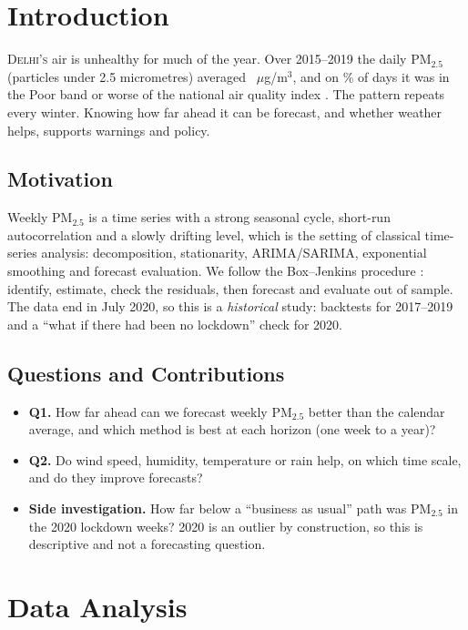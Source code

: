 \documentclass[11pt,a4paper,twoside,twocolumn]{extarticle}
\newcommand{\pmtwo}{PM$_{2.5}$}
\newcommand{\ugm}{$\mu$g/m$^3$}
\newcommand{\sech}[1]{\textbf{\textsf{#1}}}
\begin{document}
\vspace{2pt}\nolinenumbers
{\small\renewcommand{\baselinestretch}{0.9}\tableofcontents}\linenumbers

\section{Introduction}
\lettrine[lines=2,nindent=0pt]{D}{elhi's} air is unhealthy for much of the year. Over 2015--2019 the daily \pmtwo{} (particles under 2.5 micrometres) averaged \pmMean~\ugm{}, and on \pctPoor\% of days it was in the Poor band or worse of the national air quality index \cite{cpcb}. The pattern repeats every winter. Knowing how far ahead it can be forecast, and whether weather helps, supports warnings and policy.

\subsection{Motivation}
Weekly \pmtwo{} is a time series with a strong seasonal cycle, short-run autocorrelation and a slowly drifting level, which is the setting of classical time-series analysis: decomposition, stationarity, ARIMA/SARIMA, exponential smoothing and forecast evaluation. We follow the Box--Jenkins procedure \cite{box}: identify, estimate, check the residuals, then forecast and evaluate out of sample. The data end in July 2020, so this is a \emph{historical} study: backtests for 2017--2019 and a ``what if there had been no lockdown'' check for 2020.

\subsection{Questions and Contributions}
\begin{itemize}\setlength\itemsep{0pt}\setlength\topsep{2pt}
 \item \sech{Q1.} How far ahead can we forecast weekly \pmtwo{} better than the calendar average, and which method is best at each horizon (one week to a year)?
 \item \sech{Q2.} Do wind speed, humidity, temperature or rain help, on which time scale, and do they improve forecasts?
 \item \sech{Side investigation.} How far below a ``business as usual'' path was \pmtwo{} in the 2020 lockdown weeks? 2020 is an outlier by construction, so this is descriptive and not a forecasting question.
\end{itemize}

\section{Data Analysis}
\end{document}
